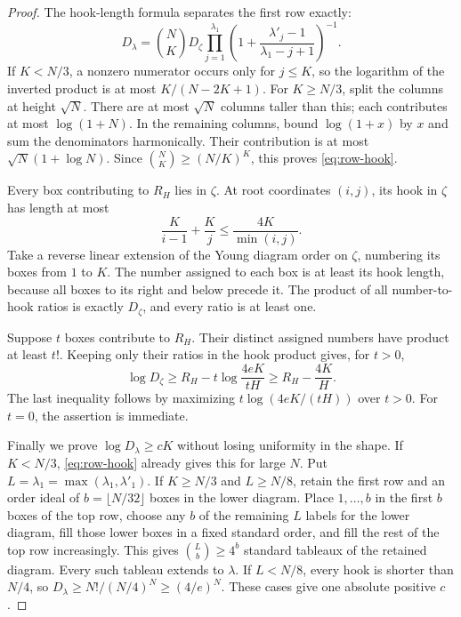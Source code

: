 \begin{proof}
The hook-length formula separates the first row exactly:
\[
 D_\lambda=\binom NKD_\zeta
 \prod_{j=1}^{\lambda_1}
 \left(1+\frac{\lambda'_j-1}{\lambda_1-j+1}\right)^{-1}.
\]
If $K<N/3$, a nonzero numerator occurs only for $j\le K$, so the logarithm of the inverted product is at most $K/(N-2K+1)$. For $K\ge N/3$, split the columns at height $\sqrt N$. There are at most $\sqrt N$ columns taller than this; each contributes at most $\log(1+N)$. In the remaining columns, bound $\log(1+x)$ by $x$ and sum the denominators harmonically. Their contribution is at most $\sqrt N(1+\log N)$. Since $\binom NK\ge(N/K)^K$, this proves \eqref{eq:row-hook}.

Every box contributing to $R_H$ lies in $\zeta$. At root coordinates $(i,j)$, its hook in $\zeta$ has length at most
\[
 \frac K{i-1}+\frac Kj\le\frac{4K}{\min(i,j)}.
\]
Take a reverse linear extension of the Young diagram order on $\zeta$, numbering its boxes from $1$ to $K$. The number assigned to each box is at least its hook length, because all boxes to its right and below precede it. The product of all number-to-hook ratios is exactly $D_\zeta$, and every ratio is at least one.

Suppose $t$ boxes contribute to $R_H$. Their distinct assigned numbers have product at least $t!$. Keeping only their ratios in the hook product gives, for $t>0$,
\[
 \log D_\zeta\ge R_H-t\log\frac{4eK}{tH}
 \ge R_H-\frac{4K}H.
\]
The last inequality follows by maximizing $t\log(4eK/(tH))$ over $t>0$. For $t=0$, the assertion is immediate.

Finally we prove $\log D_\lambda\ge cK$ without losing uniformity in the shape. If $K<N/3$, \eqref{eq:row-hook} already gives this for large $N$. Put $L=\lambda_1=\max(\lambda_1,\lambda'_1)$. If $K\ge N/3$ and $L\ge N/8$, retain the first row and an order ideal of $b=\lfloor N/32\rfloor$ boxes in the lower diagram. Place $1,\ldots,b$ in the first $b$ boxes of the top row, choose any $b$ of the remaining $L$ labels for the lower diagram, fill those lower boxes in a fixed standard order, and fill the rest of the top row increasingly. This gives $\binom Lb\ge4^b$ standard tableaux of the retained diagram. Every such tableau extends to $\lambda$. If $L<N/8$, every hook is shorter than $N/4$, so
$D_\lambda\ge N!/(N/4)^N\ge(4/e)^N$.
These cases give one absolute positive $c$.
\end{proof}

